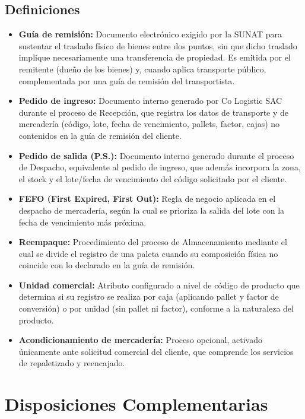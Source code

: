 \documentclass[11pt,letterpaper]{report}
\begin{document}
\section{Definiciones}
\begin{itemize}
  \item \textbf{Guía de remisión:} Documento electrónico exigido por la SUNAT para sustentar el traslado físico de bienes entre dos puntos, sin que dicho traslado implique necesariamente una transferencia de propiedad. Es emitida por el remitente (dueño de los bienes) y, cuando aplica transporte público, complementada por una guía de remisión del transportista.
  \item \textbf{Pedido de ingreso:} Documento interno generado por Co Logistic SAC durante el proceso de Recepción, que registra los datos de transporte y de mercadería (código, lote, fecha de vencimiento, pallets, factor, cajas) no contenidos en la guía de remisión del cliente.
  \item \textbf{Pedido de salida (P.S.):} Documento interno generado durante el proceso de Despacho, equivalente al pedido de ingreso, que además incorpora la zona, el stock y el lote/fecha de vencimiento del código solicitado por el cliente.
  \item \textbf{FEFO (First Expired, First Out):} Regla de negocio aplicada en el despacho de mercadería, según la cual se prioriza la salida del lote con la fecha de vencimiento más próxima.
  \item \textbf{Reempaque:} Procedimiento del proceso de Almacenamiento mediante el cual se divide el registro de una paleta cuando su composición física no coincide con lo declarado en la guía de remisión.
  \item \textbf{Unidad comercial:} Atributo configurado a nivel de código de producto que determina si su registro se realiza por caja (aplicando pallet y factor de conversión) o por unidad (sin pallet ni factor), conforme a la naturaleza del producto.
  \item \textbf{Acondicionamiento de mercadería:} Proceso opcional, activado únicamente ante solicitud comercial del cliente, que comprende los servicios de repaletizado y reencajado.
\end{itemize}

\newpage

\chapter{Disposiciones Complementarias}
\end{document}
